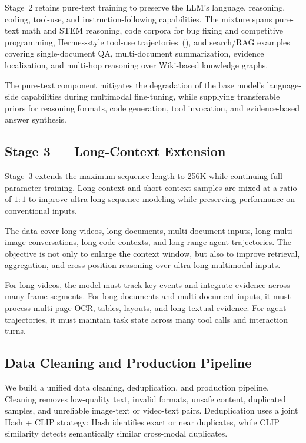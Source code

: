 \documentclass{llmxive}
\begin{document}
Stage~2 retains pure-text training to preserve the LLM's language, reasoning, coding, tool-use, and instruction-following capabilities. The mixture spans pure-text math and STEM reasoning, code corpora for bug fixing and competitive programming, Hermes-style tool-use trajectories~(\cite{hermes}), and search/RAG examples covering single-document QA, multi-document summarization, evidence localization, and multi-hop reasoning over Wiki-based knowledge graphs.

The pure-text component mitigates the degradation of the base model's language-side capabilities during multimodal fine-tuning, while supplying transferable priors for reasoning formats, code generation, tool invocation, and evidence-based answer synthesis.


\subsection{Stage 3 --- Long-Context Extension}

Stage~3 extends the maximum sequence length to 256K while continuing full-parameter training. Long-context and short-context samples are mixed at a ratio of $1{:}1$ to improve ultra-long sequence modeling while preserving performance on conventional inputs.

The data cover long videos, long documents, multi-document inputs, long multi-image conversations, long code contexts, and long-range agent trajectories. The objective is not only to enlarge the context window, but also to improve retrieval, aggregation, and cross-position reasoning over ultra-long multimodal inputs.

For long videos, the model must track key events and integrate evidence across many frame segments. For long documents and multi-document inputs, it must process multi-page OCR, tables, layouts, and long textual evidence. For agent trajectories, it must maintain task state across many tool calls and interaction turns.

\subsection{Data Cleaning and Production Pipeline}

We build a unified data cleaning, deduplication, and production pipeline. Cleaning removes low-quality text, invalid formats, unsafe content, duplicated samples, and unreliable image-text or video-text pairs. Deduplication uses a joint Hash + CLIP strategy: Hash identifies exact or near duplicates, while CLIP similarity detects semantically similar cross-modal duplicates.
\end{document}
